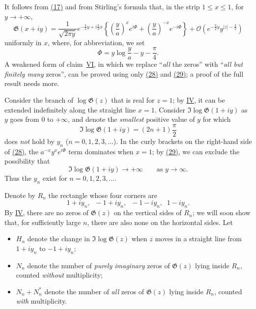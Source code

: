 \documentclass{article}
\theoremstyle{plain}
\newcommand{\GG}{\mathfrak{G}}
\newcommand{\error}{\mathcal{O}}
\renewcommand{\leq}{\leqslant}
\newcommand{\oldpage}[1]{\marginpar{\footnotesize$\Big\vert$ \textit{p.~#1}}}
\begin{document}
\begin{enumerate}[I.]
    It follows from \hyperref[17]{(17)} and from Stirling's formula that, in the strip $1\leq x\leq 1$, for $y\to+\infty$,
    \[
    \label{28}
      \GG(x+iy)
      =
      \frac{1}{\sqrt{2\pi y}} e^{-\frac\pi2 y+ i\frac\pi2 x}
      \left\{
        \left(\frac{y}{a}\right)^x e^{i\Phi} + 
        \left(\frac{y}{a}\right)^{-x} e^{-i\Phi}
      \right\} + \error\left(
        e^{-\frac\pi2 y} y^{|z| - \frac32}
      \right)
    \tag{28}
    \]
    uniformly in $x$, where, for abbreviation, we set
    \[
    \label{29}
      \Phi = y\log\frac{y}{a} - y - \frac\pi4.
    \tag{29}
    \]
    A weakened form of claim~\hyperref[VI]{VI}, in which we replace ``\emph{all} the zeros'' with ``\emph{all but finitely many} zeros'', can be proved using only \hyperref[28]{(28)} and \hyperref[29]{(29)}; a proof of the full result needs more.

    Consider the branch of $\log\GG(z)$ that is real for $z=1$;
    by \hyperref[IV]{IV}, it can be extended indefinitely along the straight line $x=1$.
    Consider $\Im\log\GG(1+iy)$ as $y$ goes from $0$ to $+\infty$, and denote the \emph{smallest} positive value of $y$ for which
    \[
      \Im\log\GG(1+iy) = (2n+1)\frac\pi2
    \]
    does \emph{not} hold by $y_n$ ($n=0,1,2,3,\ldots$).
    In the curly brackets on the right-hand side of \hyperref[28]{(28)}, the $a^{-x}y^xe^{i\Phi}$ term dominates when $x=1$;
    by \hyperref[29]{(29)}, we can exclude the possibility that
    \[
      \Im\log\GG(1+iy) \to +\infty
      \qquad\mbox{as $y\to\infty$}.
    \]
    Thus the $y_n$ exist for $n=0,1,2,3,\ldots$.

    Denote by $R_n$ the rectangle whose four corners are
    \[
      1+iy_n, \;\; -1+iy_n, \;\; -1-iy_n, \;\; 1-iy_n.
    \]
    By \hyperref[IV]{IV}, there are no zeros of $\GG(z)$ on the vertical sides of $R_n$;
    we will soon show that, for sufficiently large $n$, there are also none on the horizontal sides.
    Let
    \begin{itemize}
      \item $H_n$ denote the change in $\Im\log\GG(z)$ when $z$ moves in a straight line from $1+iy_n$ to $-1+iy_n$;
      \item $N_n$ denote the number of \emph{purely imaginary} zeros of $\GG(z)$ lying inside $R_n$, counted \emph{without} multiplicity;
\oldpage{314}
      \item $N_n+N_n^*$ denote the number of \emph{all} zeros of $\GG(z)$ lying inside $R_n$, counted \emph{with} multiplicity.
    \end{itemize}


\end{enumerate}
\end{document}
